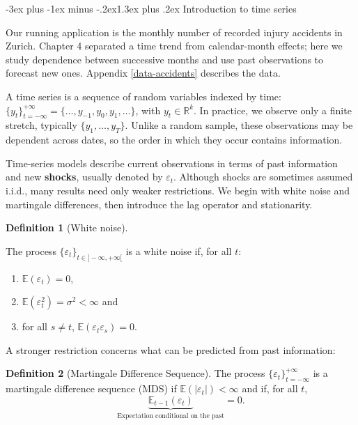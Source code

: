 \documentclass[
  11pt,
]{book}
\makeatletter
\providecommand{\tightlist}{%
  \setlength{\itemsep}{0pt}\setlength{\parskip}{0pt}}
\renewcommand\section{\@startsection{section}{1}{\z@}
  {-3ex plus -1ex minus -.2ex}{1.3ex plus .2ex}
  {\normalfont\Large\bfseries\color{TextbookInk}}}
\theoremstyle{definition}
\newtheorem{definition}{Definition}[chapter]
\theoremstyle{definition}
\theoremstyle{definition}
\theoremstyle{definition}
\theoremstyle{remark}
\makeatother
\begin{document}
\section{Introduction to time series}\label{introduction-to-time-series}

Our running application is the monthly number of recorded injury accidents in Zurich. Chapter 4 separated a time trend from calendar-month effects; here we study dependence between successive months and use past observations to forecast new ones. Appendix \ref{data-accidents} describes the data.

A time series is a sequence of random variables indexed by time: \(\{y_t\}_{t=-\infty}^{+\infty}=\{\dots,y_{-1},y_0,y_1,\dots\}\), with \(y_t\in\mathbb{R}^k\). In practice, we observe only a finite stretch, typically \(\{y_1,\dots,y_T\}\). Unlike a random sample, these observations may be dependent across dates, so the order in which they occur contains information.

Time-series models describe current observations in terms of past information and new \textbf{shocks}, usually denoted by \(\varepsilon_t\). Although shocks are sometimes assumed i.i.d., many results need only weaker restrictions. We begin with white noise and martingale differences, then introduce the lag operator and stationarity.

\begin{definition}[White noise]
\protect\hypertarget{def:whitenoise}{}\label{def:whitenoise}

The process \(\{\varepsilon_t\}_{t \in] -\infty,+\infty[}\) is a white noise if, for all \(t\):

\begin{enumerate}
\def\labelenumi{\alph{enumi}.}
\tightlist
\item
  \(\mathbb{E}(\varepsilon_t)=0\),
\item
  \(\mathbb{E}(\varepsilon_t^2)=\sigma^2<\infty\) and
\item
  for all \(s\ne t\), \(\mathbb{E}(\varepsilon_t \varepsilon_s)=0\).
\end{enumerate}

\end{definition}

A stronger restriction concerns what can be predicted from past information:

\begin{definition}[Martingale Difference Sequence]
\protect\hypertarget{def:MDS}{}\label{def:MDS}The process \(\{\varepsilon_t\}_{t = -\infty}^{+\infty}\) is a martingale difference sequence (MDS) if \(\mathbb{E}(|\varepsilon_{t}|)<\infty\) and if, for all \(t\),
\[
\underbrace{\mathbb{E}_{t-1}(\varepsilon_{t})}_{\mbox{Expectation conditional on the past}}=0.
\]
\end{definition}
\end{document}
